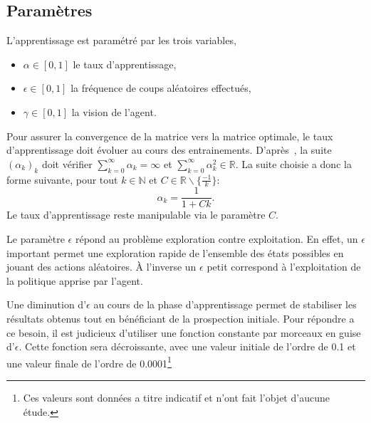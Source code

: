 \documentclass{report}
\newcommand{\R}{\mathbb{R}}
\begin{document}
\subsection{Paramètres}
L'apprentissage est paramétré par les trois variables,
\begin{itemize}
  \item \(\alpha \in [0, 1]\) le taux d'apprentissage,
  \item \(\epsilon \in [0, 1]\) la fréquence de coups aléatoires effectués,
  \item \(\gamma \in [0, 1]\) la vision de l'agent.
\end{itemize}
Pour assurer la convergence de la matrice vers la matrice optimale,
le taux d'apprentissage doit évoluer au cours des entrainements.
D'après~\cite{watkins92}, la suite \( (\alpha_k)_k \) doit vérifier
\( \sum_{k=0}^\infty \alpha_k = \infty \) et \(
\sum_{k=0}^\infty \alpha_k^2 \in \R \). La suite choisie a donc la forme
suivante, pour tout \( k \in \mathbb{N} \) et
\( C \in \R \backslash \{ \frac{-1}{k} \} \):
\[
  \alpha_k = \frac{1}{1 + Ck}.
\]
Le taux d'apprentissage reste manipulable via le paramètre \( C \).



Le paramètre \(\epsilon\) répond au problème exploration contre exploitation. En
effet, un \(\epsilon\) important permet une exploration rapide de l'ensemble
des états possibles en jouant des actions aléatoires. À l'inverse un \(\epsilon\)
petit correspond à l'exploitation de la politique apprise par l'agent.

Une diminution d'\(\epsilon\) au cours de la phase d'apprentissage permet de
stabiliser les résultats obtenus tout en bénéficiant de la prospection initiale.
Pour répondre a ce besoin, il est judicieux d'utiliser une fonction constante par
morceaux en guise d'\(\epsilon\). Cette fonction sera décroissante, avec une
valeur initiale de l'ordre de 0.1 et une valeur finale de l'ordre de
0.0001\footnote{Ces valeurs sont données a titre indicatif et n'ont fait l'objet
d'aucune étude.}
\end{document}
